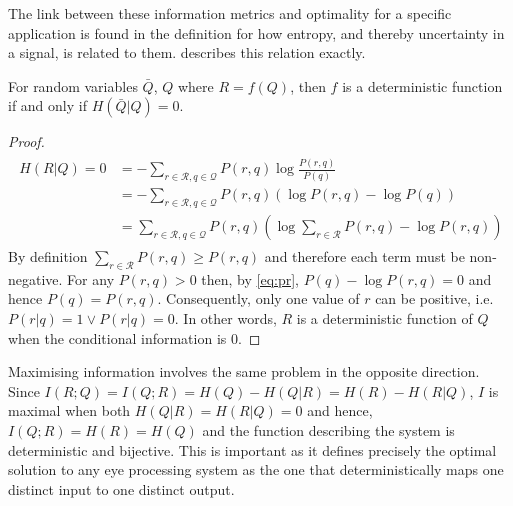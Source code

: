 The link between these information metrics and optimality for a specific application is found in the definition for how entropy, and thereby uncertainty in a signal, is related to them.  describes this relation exactly. 

\begin{theorem}
    For random variables $\bar{Q}$, $Q$ where $R=f(Q)$, then $f$ is a deterministic function if and only if $H(\bar{Q}|Q)=0$.
\end{theorem}

\begin{proof}

\begin{align}\label{eq:pr}
\begin{aligned}
    H(R|Q) = 0 &=-\sum_{r\in\mathcal{R}, q\in\mathcal{Q}} P(r,q)\log\frac{P(r,q)}{P(q)}\\
    &= -\sum_{r\in\mathcal{R}, q\in\mathcal{Q}} P(r,q)\left(\log P(r,q) - \log P(q)\right)\\
    &= \sum_{r\in\mathcal{R}, q\in\mathcal{Q}} P(r, q)\left(\log \sum_{r\in\mathcal{R}} P(r, q) - \log P(r,q)\right)
\end{aligned}
\end{align}
By definition $\sum_{r\in\mathcal{R}} P(r, q) \geq P(r,q)$ and therefore each term must be non-negative. For any $P(r,q) > 0$ then, by \cref{eq:pr}, $P(q) - \log P(r,q) = 0$ and hence $P(q) = P(r,q)$. Consequently, only one value of $r$ can be positive, i.e. $P(r|q) = 1 \vee P(r|q) = 0$. In other words, $R$ is a deterministic function of $Q$ when the conditional information is $0$. 
\end{proof}

Maximising information involves the same problem in the opposite direction. Since $I(R;Q) = I(Q; R) = H(Q) - H(Q|R) = H(R) - H(R|Q)$, $I$ is maximal when both $H(Q|R)=H(R|Q)=0$ and hence, $I(Q;R)=H(R)=H(Q)$ and the function describing the system is deterministic and bijective. This is important as it defines precisely the optimal solution to any eye processing system as the one that deterministically maps one distinct input to one distinct output.

